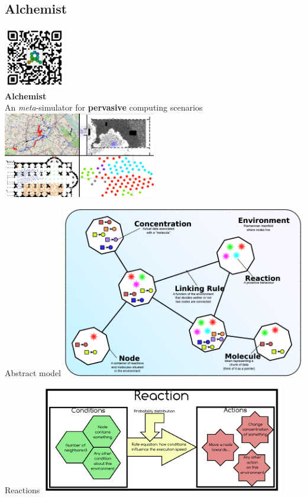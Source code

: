 \documentclass[presentation, 8pt]{beamer}\mode<presentation>{\usetheme{AMSBolognaFC}}
\begin{document}
\subsection{Alchemist}
\begin{frame}[c, plain]
\begin{center}
	\includegraphics[width=0.2\textwidth]{img/qr-code.png}\\
	\Huge \textbf{Alchemist}\\
	{\large An  \emph{meta}-simulator for \textbf{pervasive} computing scenarios}\\[0.3cm]
	\includegraphics[width=0.5\textwidth]{img/alchemist-recap.png}
\end{center}
\end{frame}
\begin{frame}{Abstract model}
\centering
\includegraphics[width=0.8\textwidth]{img/abstract-model.png}
\end{frame}
\begin{frame}{Reactions}
\centering
\includegraphics[width=0.8\textwidth]{img/reaction-model.png}
\end{frame}
\end{document}
